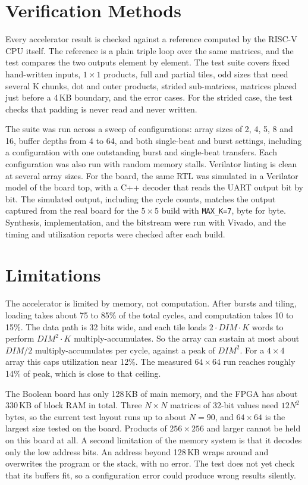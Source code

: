 \documentclass[10.5pt,a4paper]{article}
\begin{document}
\section{Verification Methods}

Every accelerator result is checked against a reference computed by the RISC-V CPU itself.
The reference is a plain triple loop over the same matrices, and the test compares the two
outputs element by element. The test suite covers fixed hand-written inputs, $1\times 1$
products, full and partial tiles, odd sizes that need several K chunks, dot and outer
products, strided sub-matrices, matrices placed just before a 4\,KB boundary, and the error
cases. For the strided case, the test checks that padding is never read and never written.

The suite was run across a sweep of configurations: array sizes of 2, 4, 5, 8 and 16, buffer
depths from 4 to 64, and both single-beat and burst settings, including a configuration with
one outstanding burst and single-beat transfers. Each configuration was also run with random
memory stalls. Verilator linting is clean at several array sizes. For the board, the same
RTL was simulated in a Verilator model of the board top, with a C++ decoder that reads the
UART output bit by bit. The simulated output, including the cycle counts, matches the output
captured from the real board for the $5\times 5$ build with \texttt{MAX\_K=7}, byte for
byte. Synthesis, implementation, and the bitstream were run with Vivado, and the timing and
utilization reports were checked after each build.

\section{Limitations}

The accelerator is limited by memory, not computation. After bursts and tiling, loading
takes about 75 to 85\% of the total cycles, and computation takes 10 to 15\%. The data path is
32 bits wide, and each tile loads $2\cdot DIM\cdot K$ words to perform $DIM^2\cdot K$
multiply-accumulates. So the array can sustain at most about $DIM/2$ multiply-accumulates per
cycle, against a peak of $DIM^2$. For a $4\times 4$ array this caps utilization near 12\%. The
measured $64\times 64$ run reaches roughly 14\% of peak, which is close to that ceiling.

The Boolean board has only 128\,KB of main memory, and the FPGA has about 330\,KB of block
RAM in total. Three $N\times N$ matrices of 32-bit values need $12N^2$ bytes, so the current
test layout runs up to about $N=90$, and $64\times 64$ is the largest size tested on the
board. Products of $256\times 256$ and larger cannot be held on this board at all. A second
limitation of the memory system is that it decodes only the low address bits. An address
beyond 128\,KB wraps around and overwrites the program or the stack, with no error. The test
does not yet check that its buffers fit, so a configuration error could produce wrong results
silently.
\end{document}

